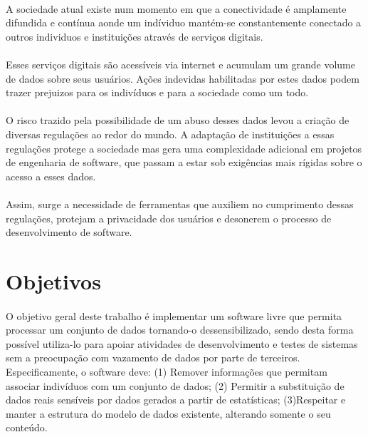 \paragraph{} A sociedade atual existe num momento em que a conectividade é amplamente difundida e contínua aonde um indíviduo mantém-se constantemente conectado a outros individuos e instituições através de serviços digitais.
\paragraph{} Esses serviços digitais são acessíveis via internet e acumulam um grande volume de dados sobre seus usuários. Ações indevidas habilitadas por estes dados podem trazer prejuizos para os indivíduos e para a sociedade como um todo.
\paragraph{} O risco trazido pela possibilidade de um abuso desses dados levou a criação de diversas regulações ao redor do mundo. A adaptação de instituições a essas regulações protege a sociedade mas gera uma complexidade adicional em projetos de engenharia de software, que passam a estar sob exigências mais rígidas sobre o acesso a esses dados.
\paragraph{} Assim, surge a necessidade de ferramentas que auxiliem no cumprimento dessas regulações, protejam a privacidade dos usuários e desonerem o processo de desenvolvimento de software.


\section{Objetivos}

\paragraph{} O objetivo geral deste trabalho é implementar um software livre que permita processar um conjunto de dados tornando-o dessensibilizado, sendo desta forma possível utiliza-lo para apoiar atividades de desenvolvimento e testes de sistemas sem a preocupação com vazamento de dados por parte de terceiros.
Especificamente, o software deve: (1) Remover informações que permitam associar indivíduos com um conjunto de dados; (2) Permitir a substituição de dados reais sensíveis por dados gerados a partir de estatísticas; (3)Respeitar e manter a estrutura do modelo de dados existente, alterando somente o seu conteúdo.


